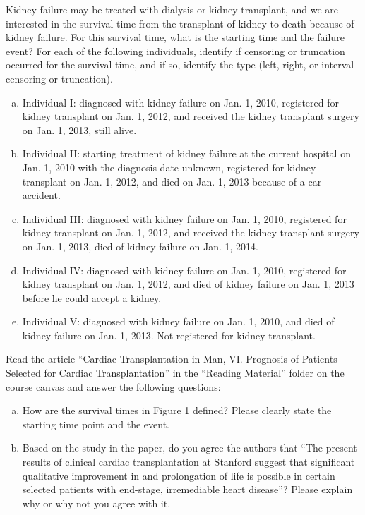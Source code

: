 \documentclass[12pt]{elegantbook}
\begin{document}
    \begin{exercise}
        Kidney failure may be treated with dialysis or kidney transplant, and we are interested in the survival time from the transplant of kidney to death because of kidney failure. For this survival time, what is the starting time and the failure event? For each of the following individuals, identify if censoring or truncation occurred for the survival time, and if so, identify the type (left, right, or interval censoring or truncation). 
        \begin{enumerate}[(a)]
            \item Individual I: diagnosed with kidney failure on Jan. 1, 2010, registered for kidney transplant on Jan. 1, 2012, and received the kidney transplant surgery on Jan. 1, 2013, still alive.
            \item Individual II: starting treatment of kidney failure at the current hospital on Jan. 1, 2010 with the diagnosis date unknown, registered for kidney transplant on Jan. 1, 2012, and died on Jan. 1, 2013 because of a car accident. 
            \item Individual III: diagnosed with kidney failure on Jan. 1, 2010, registered for kidney transplant on Jan. 1, 2012, and received the kidney transplant surgery on Jan. 1, 2013, died of kidney failure on Jan. 1, 2014. 
            \item Individual IV: diagnosed with kidney failure on Jan. 1, 2010, registered for kidney transplant on Jan. 1, 2012, and died of kidney failure on Jan. 1, 2013 before he
            could accept a kidney. 
            \item Individual V: diagnosed with kidney failure on Jan. 1, 2010, and died of kidney failure on Jan. 1, 2013. Not registered for kidney transplant.
        \end{enumerate}
    \end{exercise}

    \begin{solution}
    \end{solution}
    
    \begin{exercise}
        Read the article “Cardiac Transplantation in Man, VI. Prognosis of Patients Selected for Cardiac Transplantation” in the “Reading Material” folder on the course canvas and answer the following questions: 
        \begin{enumerate}[(a)]
            \item How are the survival times in Figure 1 defined? Please clearly state the starting time point and the event.
            \item Based on the study in the paper, do you agree the authors that “The present results of clinical cardiac transplantation at Stanford suggest that significant qualitative improvement in and prolongation of life is possible in certain selected patients with end-stage, irremediable heart disease”? Please explain why or why not you agree with it. 
        \end{enumerate}
    \end{exercise}
\end{document}
